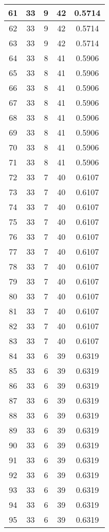 \documentclass[letterpaper, 12pt]{article}
\begin{document}
\begin{longtable}{|c|c|c|c|c|}
\hline
61 & 33 & 9 & 42 & 0.5714 \\
\hline
62 & 33 & 9 & 42 & 0.5714 \\
\hline
63 & 33 & 9 & 42 & 0.5714 \\
\hline
64 & 33 & 8 & 41 & 0.5906 \\
\hline
65 & 33 & 8 & 41 & 0.5906 \\
\hline
66 & 33 & 8 & 41 & 0.5906 \\
\hline
67 & 33 & 8 & 41 & 0.5906 \\
\hline
68 & 33 & 8 & 41 & 0.5906 \\
\hline
69 & 33 & 8 & 41 & 0.5906 \\
\hline
70 & 33 & 8 & 41 & 0.5906 \\
\hline
71 & 33 & 8 & 41 & 0.5906 \\
\hline
72 & 33 & 7 & 40 & 0.6107 \\
\hline
73 & 33 & 7 & 40 & 0.6107 \\
\hline
74 & 33 & 7 & 40 & 0.6107 \\
\hline
75 & 33 & 7 & 40 & 0.6107 \\
\hline
76 & 33 & 7 & 40 & 0.6107 \\
\hline
77 & 33 & 7 & 40 & 0.6107 \\
\hline
78 & 33 & 7 & 40 & 0.6107 \\
\hline
79 & 33 & 7 & 40 & 0.6107 \\
\hline
80 & 33 & 7 & 40 & 0.6107 \\
\hline
81 & 33 & 7 & 40 & 0.6107 \\
\hline
82 & 33 & 7 & 40 & 0.6107 \\
\hline
83 & 33 & 7 & 40 & 0.6107 \\
\hline
84 & 33 & 6 & 39 & 0.6319 \\
\hline
85 & 33 & 6 & 39 & 0.6319 \\
\hline
86 & 33 & 6 & 39 & 0.6319 \\
\hline
87 & 33 & 6 & 39 & 0.6319 \\
\hline
88 & 33 & 6 & 39 & 0.6319 \\
\hline
89 & 33 & 6 & 39 & 0.6319 \\
\hline
90 & 33 & 6 & 39 & 0.6319 \\
\hline
91 & 33 & 6 & 39 & 0.6319 \\
\hline
92 & 33 & 6 & 39 & 0.6319 \\
\hline
93 & 33 & 6 & 39 & 0.6319 \\
\hline
94 & 33 & 6 & 39 & 0.6319 \\
\hline
95 & 33 & 6 & 39 & 0.6319 \\

\end{longtable}
\end{document}
